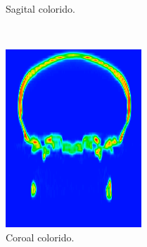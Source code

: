 \documentclass{article}
\begin{document}
\begin{figure}[h]
\begin{subfigure}[b]{0.3\textwidth}
        \caption{Sagital colorido.}
    \end{subfigure}
    ~
    \begin{subfigure}[b]{0.3\textwidth}
        \includegraphics[width=\textwidth]{skull/neuroradiologist-coronal.png}
        \caption{Coroal colorido.}
    \end{subfigure}
    ~
    \begin{subfigure}[b]{0.3\textwidth}

\end{subfigure}
\end{figure}
\end{document}
